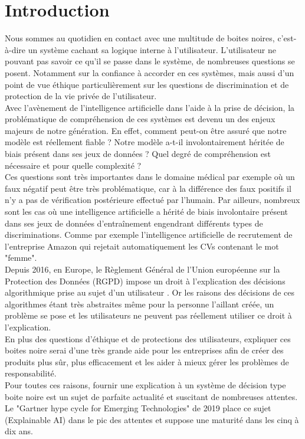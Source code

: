 \chapter*{Introduction}
\label{chap:introduction}
\vspace{5mm}
Nous sommes au quotidien en contact avec une multitude de boites noires, c’est-à-dire un système cachant sa logique interne à l’utilisateur. L’utilisateur ne pouvant pas savoir ce qu’il se passe dans le système, de nombreuses questions se posent. Notamment sur la confiance à accorder en ces systèmes, mais aussi d’un point de vue éthique particulièrement sur les questions de discrimination et de protection de la vie privée de l’utilisateur.\\

Avec l’avènement de l’intelligence artificielle dans l’aide à la prise de décision, la problématique de compréhension de ces systèmes est devenu un des enjeux majeurs de notre génération. En effet, comment peut-on être assuré que notre modèle est réellement fiable ? Notre modèle a-t-il involontairement héritée de biais présent dans ses jeux de données ? Quel degré de compréhension est nécessaire et pour quelle complexité ?\\
Ces questions sont très importantes dans le domaine médical par exemple où un faux négatif peut être très problématique, car à la différence des faux positifs il n'y a pas de vérification postérieure effectué par l'humain. Par ailleurs, nombreux sont les cas où une intelligence artificielle a hérité de biais involontaire présent dans ses jeux de données d'entraînement engendrant différents types de discriminations. Comme par exemple l'intelligence artificielle de recrutement de l'entreprise Amazon qui rejetait automatiquement les CVs contenant le mot "femme".\\

Depuis 2016, en Europe, le Règlement Général de l'Union européenne sur la Protection des Données (RGPD) impose un droit à l'explication des décisions algorithmique prise au sujet d'un utilisateur \cite{RGPDexplanRight}. Or les raisons des décisions de ces algorithmes étant très abstraites même pour la personne l'aillant créée, un problème se pose et les utilisateurs ne peuvent pas réellement utiliser ce droit à l'explication.\\

En plus des questions d'éthique et de protections des utilisateurs, expliquer ces boites noire serai d'une très grande aide pour les entreprises afin de créer des produits plus sûr, plus efficacement et les aider à mieux gérer les problèmes de responsabilité.\\
Pour toutes ces raisons, fournir une explication à un système de décision type boite noire est un sujet de parfaite actualité et suscitant de nombreuses attentes. Le "Gartner hype cycle for Emerging Technologies" de 2019 place ce sujet (Explainable AI) dans le pic des attentes et suppose une maturité dans les cinq à dix ans.\\ 

